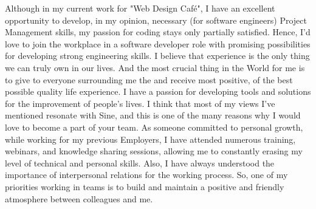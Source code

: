 \documentclass[10pt, a4paper]{awesome-cv}
\begin{document}
\begin{cvletter}
Although in my current work for "Web Design Café", I have an excellent opportunity to develop, in my opinion, necessary (for software engineers) Project Management skills, my passion for coding stays only partially satisfied. Hence, I'd love to join the workplace in a software developer role with promising possibilities for developing strong engineering skills.
I believe that experience is the only thing we can truly own in our lives. And the most crucial thing in the World for me is to give to everyone surrounding me the and receive most positive, of the best possible quality life experience. I have a passion for developing tools and solutions for the improvement of people’s lives. I think that most of my views I’ve mentioned resonate with Sine, and this is one of the many reasons why I would love to become a part of your team.  
As someone committed to personal growth, while working for my previous Employers, I have attended numerous training, webinars, and knowledge sharing sessions, allowing me to constantly erasing my level of technical and personal skills. Also, I have always understood the importance of interpersonal relations for the working process. So, one of my priorities working in teams is to build and maintain a positive and friendly atmosphere between colleagues and me. 

\end{cvletter}


\makeletterclosing
\end{document}
